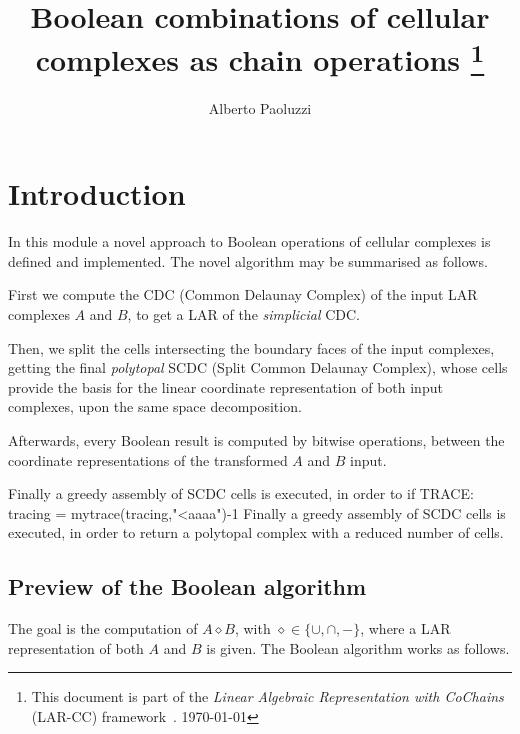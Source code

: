 \documentclass[11pt,oneside]{article}	%
\title{Boolean combinations of cellular complexes as chain operations
\footnote{This document is part of the \emph{Linear Algebraic Representation with CoChains} (LAR-CC) framework~\cite{cclar-proj:2013:00}. \today}
}
\author{Alberto Paoluzzi}
\begin{document}
\maketitle
\tableofcontents
\nonstopmode

\section{Introduction}

In this module a novel approach to Boolean operations of cellular complexes is defined and implemented. The novel algorithm may be summarised as follows. 

First we compute the CDC (Common Delaunay Complex) of the input LAR complexes $A$ and $B$, to get a LAR of the \emph{simplicial} CDC.

Then, we split the cells intersecting the boundary faces of the input complexes, getting the final \emph{polytopal} SCDC  
(Split Common Delaunay Complex), whose cells  provide the  basis for the linear coordinate representation of both input 
complexes, upon the same space decomposition.

Afterwards, every Boolean result is computed by bitwise operations, between the coordinate representations of the transformed $A$ and $B$ input.


Finally a greedy assembly of SCDC cells is executed, in order to if TRACE: tracing = mytrace(tracing,"<aaaa")-1
Finally a greedy assembly of SCDC cells is executed, in order to return a polytopal complex with a reduced number of cells.



\subsection{Preview of the Boolean algorithm}

The goal is the computation of $A \diamond B$, with $\diamond\in \{\cup, \cap, -\}$, where a LAR representation of both $A$ and $B$ is given. The Boolean algorithm works as follows.
\end{document}
